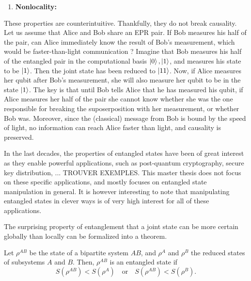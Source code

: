 \begin{enumerate} %
    \item \textbf{Nonlocality:} 
\end{enumerate}

These properties are counterintuitive. Thankfully, they do not break causality. Let us assume that Alice and Bob share an EPR pair. If Bob measures his half of the pair, can Alice immediately know the result of Bob's measurement, which would be faster-than-light communication ? Imagine that Bob measures his half of the entangled pair in the computational basis $\ket{0}, \ket{1}$, and measures his state to be $\ket{1}$. Then the joint state has been reduced to $\ket{11}$. Now, if Alice measures her qubit after Bob's measurement, she will also measure her qubit to be in the state $\ket{1}$. The key is that until Bob tells Alice that he has measured his qubit, if Alice measures her half of the pair she cannot know whether she was the one responsible for breaking the suposerposition with her measurement, or whether Bob was. Moreover, since the (classical) message from Bob is bound by the speed of light, no information can reach Alice faster than light, and causality is preserved.

In the last decades, the properties of entangled states have been of great interest as they enable powerful applications, such as post-quantum cryptography, secure key distribution, ... TROUVER EXEMPLES. This master thesis does not focus on these specific applications, and mostly focuses on entangled state manipulation in general. It is however interesting to note that manipulating entangled states in clever ways is of very high interest for all of these applications.

The surprising property of entanglement that a joint state can be more certain globally than locally can be formalized into a theorem.

\begin{theorem} \label{th:entropic_criterion}
    Let $\rho^{AB}$ be the state of a bipartite system $AB$, and $\rho^A$ and $\rho^B$ the reduced states of subsystems $A$ and $B$. Then, $\rho^{AB}$ is an entangled state if 
    \begin{equation}
        S(\rho^{AB}) < S(\rho^A) \quad \text{or} \quad S(\rho^{AB}) < S(\rho^B).
    \end{equation}
\end{theorem}

